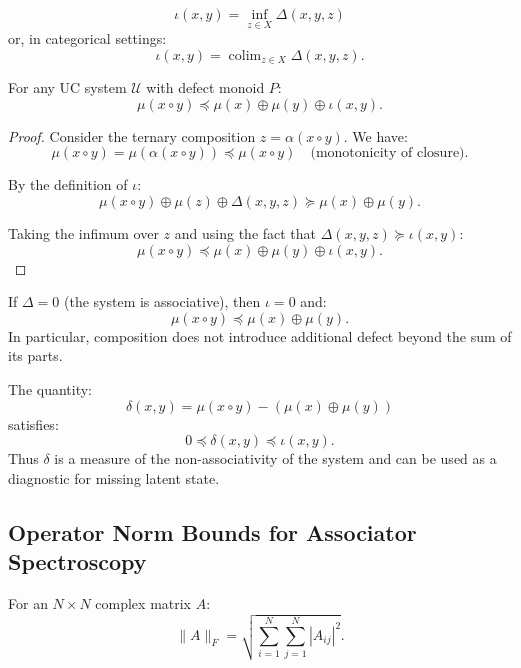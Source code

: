 \documentclass[11pt]{article}
\begin{document}
\begin{enumerate}
\begin{definition}
\[
\iota(x, y) = \inf_{z \in X} \Delta(x, y, z)
\]
or, in categorical settings:
\[
\iota(x, y) = \operatorname{colim}_{z \in X} \Delta(x, y, z).
\]
\end{definition}

\begin{theorem}
For any UC system $\mathcal{U}$ with defect monoid $P$:
\[
\mu(x \circ y) \preceq \mu(x) \oplus \mu(y) \oplus \iota(x, y).
\]
\end{theorem}

\begin{proof}
Consider the ternary composition $z = \alpha(x \circ y)$. We have:
\[
\mu(x \circ y) = \mu(\alpha(x \circ y)) \preceq \mu(x \circ y) \quad \text{(monotonicity of closure)}.
\]

By the definition of $\iota$:
\[
\mu(x \circ y) \oplus \mu(z) \oplus \Delta(x, y, z) \succeq \mu(x) \oplus \mu(y).
\]

Taking the infimum over $z$ and using the fact that $\Delta(x, y, z) \succeq \iota(x, y)$:
\[
\mu(x \circ y) \preceq \mu(x) \oplus \mu(y) \oplus \iota(x, y).
\]
\end{proof}

\begin{corollary}
If $\Delta = 0$ (the system is associative), then $\iota = 0$ and:
\[
\mu(x \circ y) \preceq \mu(x) \oplus \mu(y).
\]
In particular, composition does not introduce additional defect beyond the sum of its parts.
\end{corollary}

\begin{corollary}
The quantity:
\[
\delta(x, y) = \mu(x \circ y) - (\mu(x) \oplus \mu(y))
\]
satisfies:
\[
0 \preceq \delta(x, y) \preceq \iota(x, y).
\]
Thus $\delta$ is a measure of the non-associativity of the system and can be used as a diagnostic for missing latent state.
\end{corollary}

\subsection{Operator Norm Bounds for Associator Spectroscopy}

\begin{definition}
For an $N \times N$ complex matrix $A$:
\[
\| A \|_F = \sqrt{\sum_{i=1}^N \sum_{j=1}^N |A_{ij}|^2}.
\]
\end{definition}


\end{enumerate}
\end{document}

